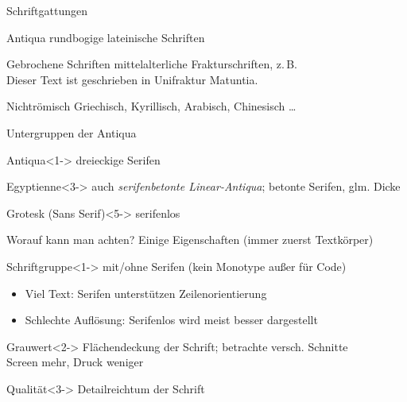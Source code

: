 \documentclass[ngerman,draft, usepdftitle=true]{beamer}
\begin{document}
\begin{frame}{Schriftgattungen}
  \begin{block}{Antiqua}
    rundbogige lateinische Schriften
  \end{block}
  \begin{block}{Gebrochene Schriften}
    mittelalterliche Frakturschriften, z.\,B.\\
    {\fontfamilyfraktur Dieser Text ist geschrieben in Unifraktur Matuntia.}
  \end{block}
  \begin{block}{Nichtrömisch}
    Griechisch, Kyrillisch, Arabisch, Chinesisch …
  \end{block}
\end{frame}

\begin{frame}{Untergruppen der Antiqua}
  \begin{block}{Antiqua}<1->
    dreieckige Serifen\\
  \end{block}
  \begin{block}{Egyptienne}<3->
    auch \emph{serifenbetonte Linear-Antiqua}; 
    betonte Serifen, glm. Dicke\\
  \end{block}
  \begin{block}{Grotesk (Sans Serif)}<5->
    serifenlos\\ 
  \end{block}
\end{frame}

\begin{frame}{Worauf kann man achten?}
  Einige Eigenschaften (immer zuerst Textkörper)
  \begin{block}{Schriftgruppe}<1->
    mit/ohne Serifen (kein Monotype außer für Code)
    \begin{itemize}
    \item Viel Text: Serifen unterstützen Zeilenorientierung
    \item Schlechte Auflösung: Serifenlos wird meist besser
      dargestellt
    \end{itemize}
  \end{block}
  \begin{block}{Grauwert}<2->
    Flächendeckung der Schrift; betrachte versch. Schnitte\\
    Screen mehr, Druck weniger
  \end{block}
  \begin{block}{Qualität}<3->
    Detailreichtum der Schrift
  \end{block}
\end{frame}
\end{document}

